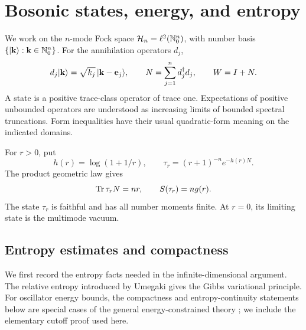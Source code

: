\section{Bosonic states, energy, and entropy}\label{sec:preliminaries}
We work on the \(n\)-mode Fock space
\(\mathcal H_n=\ell^2(\mathbb N_0^n)\), with number basis
\(\{|\mathbf k\rangle:\mathbf k\in\mathbb N_0^n\}\). For the annihilation operators \(d_j\),
\[
 d_j|\mathbf k\rangle=\sqrt{k_j}\,|\mathbf k-\mathbf e_j\rangle,
 \qquad N=\sum_{j=1}^n d_j^\dagger d_j,
 \qquad W=I+N.
\]
A state is a positive trace-class operator of trace one. Expectations of positive unbounded operators are understood as increasing limits of bounded spectral truncations. Form inequalities have their usual quadratic-form meaning on the indicated domains.

For \(r>0\), put
\begin{equation}\label{eq:thermal-definition}
 h(r)=\log(1+1/r),\qquad
 \tau_r=(r+1)^{-n}e^{-h(r)N}.
\end{equation}
The product geometric law gives
\begin{equation}\label{eq:thermal-moments}
 \operatorname{Tr}\tau_rN=nr,\qquad S(\tau_r)=ng(r).
\end{equation}
The state \(\tau_r\) is faithful and has all number moments finite. At \(r=0\), its limiting state is the multimode vacuum.

\subsection{Entropy estimates and compactness}
We first record the entropy facts needed in the infinite-dimensional argument.
The relative entropy introduced by Umegaki \cite{Umegaki1962} gives the
Gibbs variational principle. For oscillator energy bounds, the compactness
and entropy-continuity statements below are special cases of the general
energy-constrained theory \cite{Shirokov2006,Winter2016}; we include the
elementary cutoff proof used here.

